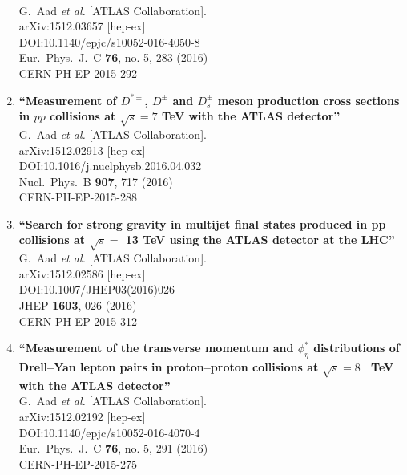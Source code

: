\documentclass{article}
\begin{document}
\begin{enumerate}
  \\{}G.~Aad {\it et al.} [ATLAS Collaboration].
  \\{}arXiv:1512.03657 [hep-ex]
  \\{}DOI:10.1140/epjc/s10052-016-4050-8
  \\{}Eur.\ Phys.\ J.\ C {\bf 76}, no. 5, 283 (2016)
  \\{}CERN-PH-EP-2015-292
\item%
{\bf ``Measurement of $D^{*\pm}$, $D^\pm$ and $D_s^\pm$ meson production cross sections in $pp$ collisions at $\sqrt{s}=7$ TeV with the ATLAS detector''}
  \\{}G.~Aad {\it et al.} [ATLAS Collaboration].
  \\{}arXiv:1512.02913 [hep-ex]
  \\{}DOI:10.1016/j.nuclphysb.2016.04.032
  \\{}Nucl.\ Phys.\ B {\bf 907}, 717 (2016)
  \\{}CERN-PH-EP-2015-288
\item%
{\bf ``Search for strong gravity in multijet final states produced in pp collisions at $\sqrt{s} =$ 13 TeV using the ATLAS detector at the LHC''}
  \\{}G.~Aad {\it et al.} [ATLAS Collaboration].
  \\{}arXiv:1512.02586 [hep-ex]
  \\{}DOI:10.1007/JHEP03(2016)026
  \\{}JHEP {\bf 1603}, 026 (2016)
  \\{}CERN-PH-EP-2015-312
\item%
{\bf ``Measurement of the transverse momentum and $\phi ^*_{\eta }$ distributions of Drell–Yan lepton pairs in proton–proton collisions at $\sqrt{s}=8$  TeV with the ATLAS detector''}
  \\{}G.~Aad {\it et al.} [ATLAS Collaboration].
  \\{}arXiv:1512.02192 [hep-ex]
  \\{}DOI:10.1140/epjc/s10052-016-4070-4
  \\{}Eur.\ Phys.\ J.\ C {\bf 76}, no. 5, 291 (2016)
  \\{}CERN-PH-EP-2015-275

\end{enumerate}
\end{document}
